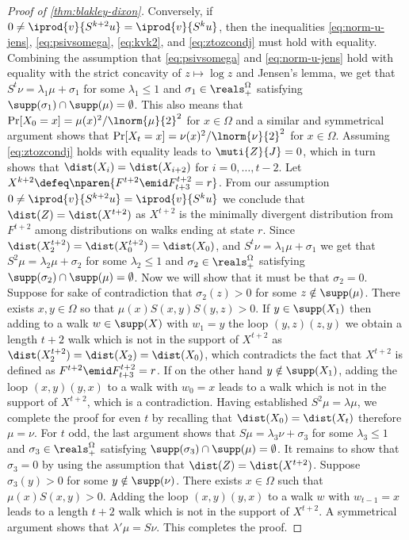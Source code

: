 \begin{proof}[Proof of \autoref{thm:blakley-dixon}]
Conversely, if 
$0\neq \iprod{v}{S^{k+2}u}=\iprod{v}{S^ku}$, then the
inequalities
\eqref{eq:norm-u-jens}, 
\eqref{eq:psivsomega},
\eqref{eq:kvk2},
 and
\eqref{eq:ztozcondj} must hold with equality.
Combining the assumption that \autoref{eq:psivsomega}
and \eqref{eq:norm-u-jens} 
hold with equality with the strict concavity of
$z\mapsto \log z$ and Jensen's lemma, we get that 
$S^t\nu = \lambda_1\mu + \sigma_1$ for some $\lambda_1\le 1$ and $\sigma_1\in\reals^{\Omega}_{+}$ satisfying 
$\supp(\sigma_1)\cap\supp(\mu)=\emptyset$. This also means that $\Pr[X_0 = x] = \mu(x)^2/\lnorm{\mu}{2}^2$ for $x\in \Omega$ and a similar and symmetrical argument shows that
$\Pr[X_t = x] = \nu(x)^2/\lnorm{\nu}{2}^2$ for 
$x\in\Omega$.
Assuming \autoref{eq:ztozcondj} holds 
with equality leads to $\muti{Z}{J}=0$, which in turn
shows that $\dist(X_i)=\dist(X_{i+2})$ for 
$i=0,\ldots,t-2$. 
Let 
$X^{k+2} \defeq \nparen{F^{t+2}\emid F^{t+2}_{t+3}=r}$.
From our assumption $0\neq \iprod{v}{S^{k+2}u}=\iprod{v}{S^ku}$ we conclude that $\dist(Z)=\dist(X^{t+2})$
as $X^{t+2}$ is the minimally divergent distribution from $F^{t+2}$ among distributions on walks ending at state $r$. Since 
$\dist(X^{t+2}_2)=\dist(X^{t+2}_0)=\dist(X_0)$, and $S^t\nu=\lambda_1\mu+\sigma_1$ we get that 
$S^2\mu = \lambda_2 \mu + \sigma_2$  for some $\lambda_2\le 1$ and $\sigma_2\in\reals^{\Omega}_{+}$ satisfying 
$\supp(\sigma_2)\cap\supp(\mu)=\emptyset$. Now we will show that it must be that $\sigma_2=0$. Suppose for sake of contradiction that $\sigma_2(z)>0$ for some $z\notin \supp(\mu)$. There exists $x,y\in\Omega$ so that $\mu(x)S(x,y)S(y,z)>0$. If $y\in\supp(X_1)$ then adding to a walk $w\in \supp(X)$ with $w_1=y$ the loop $(y,z)(z,y)$
we obtain a length $t+2$ walk which is not in the support of $X^{t+2}$ as $\dist(X^{t+2}_2)=\dist(X_2)=\dist(X_0)$,
which contradicts the fact that 
$X^{t+2}$ is defined as $F^{t+2}\emid F^{t+2}_{t+3}=r$.
If on the other hand $y\notin\supp(X_1)$, 
adding the loop $(x,y)(y,x)$ to a walk with $w_0=x$ 
leads to a walk which is not in the support of $X^{t+2}$, 
which is a contradiction. Having established $S^2\mu = \lambda \mu$, we complete the proof for even $t$
by recalling that $\dist(X_0)=\dist(X_t)$ therefore $\mu=\nu$. For $t$ odd, the last argument shows that
 $S\mu = \lambda_3\nu + \sigma_3$ for some $\lambda_3\le 1$ and $\sigma_3\in\reals^{\Omega}_{+}$ satisfying 
$\supp(\sigma_3)\cap\supp(\mu)=\emptyset$. 
It remains to show that $\sigma_3=0$ 
by using the assumption that $\dist(Z)=\dist(X^{t+2})$. Suppose $\sigma_3(y)>0$ for some $y\notin\supp(\nu)$. There exists $x\in\Omega$ such that $\mu(x)S(x,y)>0$. Adding the loop $(x,y)(y,x)$ to
a walk $w$ with $w_{t-1}=x$ leads to a length $t+2$ walk
which is not in the support of $X^{t+2}$. A symmetrical
argument shows that $\lambda'\mu = S\nu$. This completes the proof.
\end{proof}